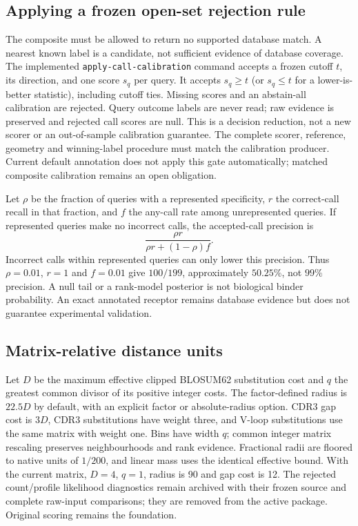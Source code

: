 \documentclass[10pt,a4paper]{article}
\theoremstyle{definition}
\begin{document}
\subsection*{Applying a frozen open-set rejection rule}
The composite must be allowed to return no supported database match. A nearest
known label is a candidate, not sufficient evidence of database coverage.
The implemented \texttt{apply-call-calibration} command accepts a frozen cutoff
$t$, its direction, and one score $s_q$ per query. It accepts $s_q\ge t$ (or
$s_q\le t$ for a lower-is-better statistic), including cutoff ties. Missing
scores and an abstain-all calibration are rejected. Query outcome labels are
never read; raw evidence is preserved and rejected call scores are null.
This is a decision reduction, not a new scorer or an out-of-sample calibration
guarantee. The complete scorer, reference, geometry and winning-label procedure
must match the calibration producer. Current default annotation does not apply
this gate automatically; matched composite calibration remains an open obligation.

Let $\rho$ be the fraction of queries with a represented specificity, $r$ the
correct-call recall in that fraction, and $f$ the any-call rate among unrepresented
queries. If represented queries make no incorrect calls, the accepted-call
precision is
\[
 \frac{\rho r}{\rho r+(1-\rho)f}.
\]
Incorrect calls within represented queries can only lower this precision.
Thus $\rho=0.01$, $r=1$ and $f=0.01$ give $100/199$, approximately $50.25\%$,
not $99\%$ precision. A null tail or a rank-model posterior is not biological
binder probability. An exact annotated receptor remains database evidence but
does not guarantee experimental validation.

\subsection*{Matrix-relative distance units}
Let $D$ be the maximum effective clipped BLOSUM62 substitution cost and $q$
the greatest common divisor of its positive integer costs. The factor-defined
radius is $22.5D$ by default, with an explicit factor or absolute-radius option.
CDR3 gap cost is $3D$, CDR3 substitutions have weight three, and V-loop
substitutions use the same matrix with weight one. Bins have width $q$;
common integer matrix rescaling preserves neighbourhoods and rank evidence.
Fractional radii are floored to native units of $1/200$, and linear mass uses
the identical effective bound. With the current matrix, $D=4$, $q=1$,
radius is 90 and gap cost is 12.
The rejected count/profile likelihood diagnostics remain archived with their
frozen source and complete raw-input comparisons; they are removed from the
active package. Original scoring remains the foundation.
\end{document}
